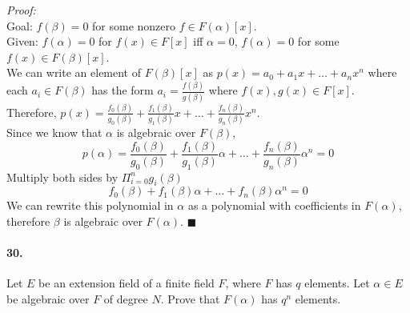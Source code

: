\documentclass[10pt,a4paper]{article}
\begin{document}
\begin{flushleft}
\textit{Proof:}\\
Goal: $f(\beta) = 0$ for some nonzero $f \in F(\alpha)[x]$.\\
Given: $f(\alpha) =0 $ for $f(x) \in F[x]$ iff $\alpha = 0$, $f(\alpha) = 0$ for some $f(x) \in F(\beta)[x]$.\\
We can write an element of $F(\beta)[x]$ as $p(x) = a_0 + a_1x + \dots + a_nx^n$ where each $a_i \in F(\beta)$ has the form $a_i = \frac{f(\beta)}{g(\beta)}$ where $f(x), g(x) \in F[x]$. \\
Therefore, $p(x) = \frac{f_0(\beta)}{g_0(\beta)} + \frac{f_1(\beta)}{g_1(\beta)}x + \dots + \frac{f_n(\beta)}{g_n(\beta)}x^n$.\\
Since we know that $\alpha$ is algebraic over $F(\beta)$, $$p(\alpha) = \frac{f_0(\beta)}{g_0(\beta)} + \frac{f_1(\beta)}{g_1(\beta)}\alpha + \dots + \frac{f_n(\beta)}{g_n(\beta)}\alpha^n = 0$$
Multiply both sides by $\Pi_{i=0}^n g_i(\beta)$
$$ f_0(\beta) + f_1(\beta)\alpha + \dots + f_n(\beta)\alpha^n = 0$$
We can rewrite this polynomial in $\alpha$ as a polynomial with coefficients in $F(\alpha)$, therefore $\beta$ is algebraic over $F(\alpha)$. $\blacksquare$
\end{flushleft}

\paragraph{30.} Let $E$ be an extension field of a finite field $F$, where $F$ has $q$ elements. Let $\alpha \in E$ be algebraic over $F$ of degree $N$. Prove that $F(\alpha)$ has $q^n$ elements.
\end{document}
